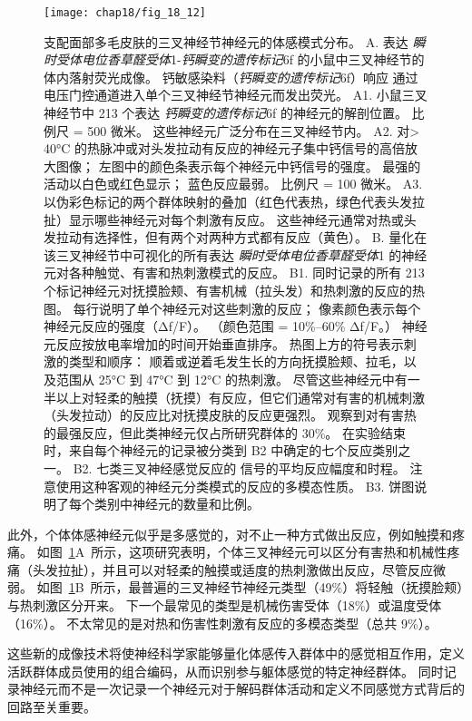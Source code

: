 \begin{figure}[htbp]
	\centering
	\texttt{[image: chap18/fig\_18\_12]}
	\caption{支配面部多毛皮肤的三叉神经节神经元的体感模式分布\cite{ghitani2017specialized}。
		A. 表达 \textit{瞬时受体电位香草醛受体}1-\textit{钙瞬变的遗传标记}6f 的小鼠中三叉神经节的体内落射荧光成像。 
		钙敏感染料（\textit{钙瞬变的遗传标记}6f）响应  通过电压门控通道进入单个三叉神经节神经元而发出荧光。
		A1. 小鼠三叉神经节中 213 个表达 \textit{钙瞬变的遗传标记}6f 的神经元的解剖位置。
		比例尺 = 500 微米。
		这些神经元广泛分布在三叉神经节内。 
		A2. 对> 40°C 的热脉冲或对头发拉动有反应的神经元子集中钙信号的高倍放大图像；
		左图中的颜色条表示每个神经元中钙信号的强度。
		最强的活动以白色或红色显示；
		蓝色反应最弱。
		比例尺 = 100 微米。
		A3. 以伪彩色标记的两个群体映射的叠加（红色代表热，绿色代表头发拉扯）显示哪些神经元对每个刺激有反应。
		这些神经元通常对热或头发拉动有选择性，但有两个对两种方式都有反应（黄色）。
		B. 量化在该三叉神经节中可视化的所有表达 \textit{瞬时受体电位香草醛受体}1 的神经元对各种触觉、有害和热刺激模式的反应。
		B1. 同时记录的所有 213 个标记神经元对抚摸脸颊、有害机械（拉头发）和热刺激的反应的热图。
		每行说明了单个神经元对这些刺激的反应；
		像素颜色表示每个神经元反应的强度（Δf/F）。
		（颜色范围 = 10\%–60\% Δf/F。）
		神经元反应按放电率增加的时间开始垂直排序。
		热图上方的符号表示刺激的类型和顺序：
		顺着或逆着毛发生长的方向抚摸脸颊、拉毛，以及范围从 25°C 到 47°C 到 12°C 的热刺激。
		尽管这些神经元中有一半以上对轻柔的触摸（抚摸）有反应，但它们通常对有害的机械刺激（头发拉动）的反应比对抚摸皮肤的反应更强烈。
		观察到对有害热的最强反应，但此类神经元仅占所研究群体的 30\%。
		在实验结束时，来自每个神经元的记录被分类到 B2 中确定的七个反应类别之一。
		B2. 七类三叉神经感觉反应的  信号的平均反应幅度和时程。 注意使用这种客观的神经元分类模式的反应的多模态性质。
		B3. 饼图说明了每个类别中神经元的数量和比例。}
	\label{fig:18_12}
\end{figure}


此外，个体体感神经元似乎是多感觉的，对不止一种方式做出反应，例如触摸和疼痛。
如图~\ref{fig:18_12}A~所示，这项研究表明，个体三叉神经元可以区分有害热和机械性疼痛（头发拉扯），并且可以对轻柔的触摸或适度的热刺激做出反应，尽管反应微弱。
如图~\ref{fig:18_12}B~所示，最普遍的三叉神经节神经元类型（49\%）将轻触（抚摸脸颊）与热刺激区分开来。 
下一个最常见的类型是机械伤害受体（18\%）或温度受体（16\%）。
不太常见的是对热和伤害性刺激有反应的多模态类型（总共 9\%）。


这些新的成像技术将使神经科学家能够量化体感传入群体中的感觉相互作用，定义活跃群体成员使用的组合编码，从而识别参与躯体感觉的特定神经群体。
同时记录神经元而不是一次记录一个神经元对于解码群体活动和定义不同感觉方式背后的回路至关重要。


